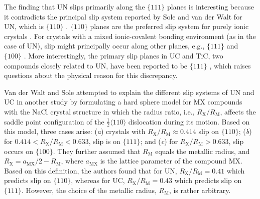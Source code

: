 \documentclass[applsci,article,submit,pdftex,moreauthors]{Definitions/mdpi}
\newcommand{\?}{\stackrel{?}{=}}
\begin{document}
The finding that UN slips primarily along the $\{111\}$ planes is interesting because it contradicts the principal slip system reported by Sole and van der Walt for UN, which is $\{110\}$ \cite{Sole1968}. $\{110\}$ planes are the preferred slip system for purely ionic crystals \cite{VanDerWalt1967, Hull2011}. For crystals with a mixed ionic-covalent bonding environment (as in the case of UN), slip might principally occur along other planes, e.g., $\{111\}$ and $\{100\}$ \cite{VanDerWalt1967, Yadav2014}. More interestingly, the primary slip planes in UC and TiC, two compounds closely related to UN, have been reported to be $\{111\}$ \cite{Sole1968, Vasudevamurthy2022}, which raises questions about the physical reason for this discrepancy.

Van der Walt and Sole attempted to explain the different slip systems of UN and UC in another study \cite{VanDerWalt1967} by formulating a hard sphere model for MX compounds with the NaCl crystal structure in which the radius ratio, i.e., $R_\text{X}/R_\text{M}$, affects the saddle point configuration of the $\frac{1}{2}\langle110\rangle$ dislocation during its motion. Based on this model, three cases arise: (\textit{a}) crystals with $R_\text{X}/R_\text{M} \approx 0.414$ slip on $\{110\}$; (\textit{b}) for $0.414 < R_\text{X}/R_\text{M} < 0.633$, slip is on $\{111\}$; and (\textit{c}) for $R_\text{X}/R_\text{M} > 0.633$, slip occurs on $\{100\}$. They further assumed that $R_\text{M}$ equals the metallic radius, and $R_\text{X} = a_\text{MX}/2 - R_\text{M}$, where $a_\text{MX}$ is the lattice parameter of the compound MX. Based on this definition, the authors found that for UN, $R_\text{X}/R_\text{M} = 0.41$ which predicts slip on $\{110\}$, whereas for UC, $R_\text{X}/R_\text{M} = 0.43$ which predicts slip on $\{111\}$. However, the choice of the metallic radius, $R_\text{M}$, is rather arbitrary.
\end{document}
